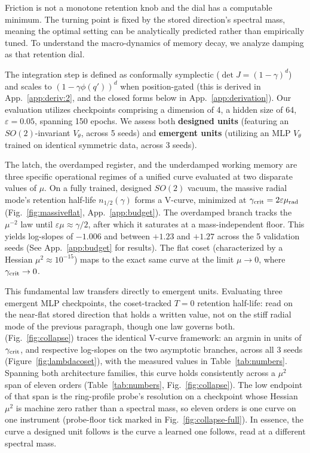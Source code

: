 \documentclass{article}
\begin{document}
Friction is not a monotone retention knob and the dial has a computable minimum. The turning point is fixed by the stored direction's spectral mass, meaning the optimal setting can be analytically predicted rather than empirically tuned. To understand the macro-dynamics of memory decay, we analyze damping as that retention dial.

The integration step is defined as conformally symplectic ($\det J=(1-\gamma)^d$) and scales to $(1-\gamma\phi(q'))^d$ when position-gated (this is derived in App.~\ref{app:deriv:2}, and the closed forms below in App.~\ref{app:derivation}). Our evaluation utilizes checkpoints comprising a dimension of 4, a hidden size of 64, $\varepsilon=0.05$, spanning 150 epochs. We assess both \textbf{designed units} (featuring an $SO(2)$-invariant $V_\theta$, across 5 seeds) and \textbf{emergent units} (utilizing an MLP $V_\theta$ trained on identical symmetric data, across 3 seeds).

The latch, the overdamped register, and the underdamped working memory are three specific operational regimes of a unified curve evaluated at two disparate values of $\mu$. On a fully trained, designed $SO(2)$ vacuum, the massive radial mode's retention half-life $n_{1/2}(\gamma)$ forms a V-curve, minimized at $\gamma_{\rm crit}=2\varepsilon\mu_{\rm rad}$ (Fig.~\ref{fig:massiveflat}, App.~\ref{app:budget}). The overdamped branch tracks the $\mu^{-2}$ law until $\varepsilon\mu\approx\gamma/2$, after which it saturates at a mass-independent floor. This yields log-slopes of $-1.006$ and between $+1.23$ and $+1.27$ across the 5 validation seeds (See App.~\ref{app:budget} for results). The flat coset (characterized by a Hessian $\mu^2\approx10^{-15}$) maps to the exact same curve at the limit $\mu\to0$, where $\gamma_{\rm crit}\to0$.

This fundamental law transfers directly to emergent units. Evaluating three emergent MLP checkpoints, the coset-tracked $T=0$ retention half-life: read on the near-flat stored direction that holds a written value, not on the stiff radial mode of the previous paragraph, though one law governs both. (Fig.~\ref{fig:collapse}) traces the identical V-curve framework: an argmin in units of $\gamma_{\rm crit}$, and respective log-slopes on the two asymptotic branches, across all 3 seeds (Figure~\ref{fig:lambdacoset}), with the measured values in Table~\ref{tab:numbers}. Spanning both architecture families, this curve holds consistently across a $\mu^2$ span of eleven orders (Table~\ref{tab:numbers}, Fig.~\ref{fig:collapse}). The low endpoint of that span is the ring-profile probe's resolution on a checkpoint whose Hessian $\mu^2$ is machine zero rather than a spectral mass, so eleven orders is one curve on one instrument (probe-floor tick marked in Fig.~\ref{fig:collapse-full}). In essence, the curve a designed unit follows is the curve a learned one follows, read at a different spectral mass.
\end{document}
